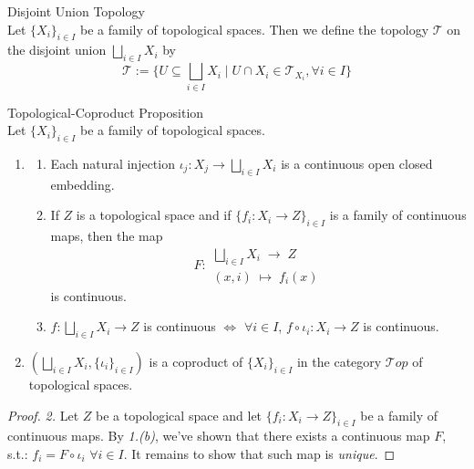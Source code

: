 \begin{definition}{Disjoint Union Topology}\\
Let $\{ X_i\}_{i \in I}$ be a family of topological spaces. Then we define the topology $\mathcal{T}$ on the disjoint union $\bigsqcup_{i \in I} X_i$ by
$$\mathcal{T} := \{U \subseteq \bigsqcup_{i \in I} X_i \mid U \cap X_i \in \mathcal{T}_{X_i}, \forall i \in I\}$$
\end{definition}

\begin{proposition}{Topological-Coproduct Proposition}\\
Let $\{X_i\}_{i \in I}$ be a family of topological spaces.
\begin{enumerate}
    \item \begin{enumerate}
        \item Each natural injection $\iota_j: X_j \to \bigsqcup_{i \in I}X_i$ is a continuous open closed embedding.
        \item If $Z$ is a topological space and if $\{f_i : X_i\to Z \}_{i \in I}$ is a family of continuous maps, then the map
        $$F: \substack{\bigsqcup_{i \in I} X_i \;\to\; Z\\
        (x,i) \;\mapsto\; f_i(x)}$$
        is continuous.
        \item $f: \bigsqcup_{i \in I} X_i \to Z$ is continuous $\Leftrightarrow$ $\forall i \in I$, $f\circ \iota_i : X_i \to Z$ is continuous.
    \end{enumerate}
    \item $(\bigsqcup_{i \in I}X_i, \{\iota_i\}_{i \in I})$ is a coproduct of $\{X_i\}_{i \in I}$ in the category $\mathcal{T}op$ of topological spaces.
\end{enumerate}
\end{proposition}

\begin{proof}
    \textit{2.} Let $Z$ be a topological space and let $\{f_i: X_i \to Z\}_{i \in I}$ be a family of continuous maps. By \textit{1.(b)}, we've shown that there exists a continuous map $F$, s.t.: $f_i= F \circ \iota_i$ $\forall i \in I$. It remains to show that such map is \textit{unique}.
\end{proof}

